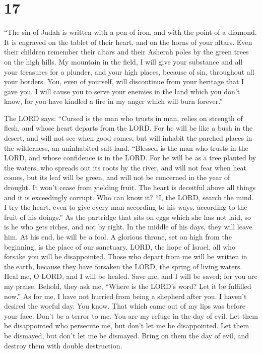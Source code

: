 \hypertarget{section-16}{%
\section{17}\label{section-16}}

 ``The sin of Judah is written with a pen of iron, and
with the point of a diamond. It is engraved on the tablet of their
heart, and on the horns of your altars.  Even their
children remember their altars and their Asherah poles by the green
trees on the high hills.  My mountain in the field, I will
give your substance and all your treasures for a plunder, and your high
places, because of sin, throughout all your borders.  You,
even of yourself, will discontinue from your heritage that I gave you. I
will cause you to serve your enemies in the land which you don't know,
for you have kindled a fire in my anger which will burn forever.''

 The LORD says: ``Cursed is the man who trusts in man,
relies on strength of flesh, and whose heart departs from the LORD.
 For he will be like a bush in the desert, and will not
see when good comes, but will inhabit the parched places in the
wilderness, an uninhabited salt land.  ``Blessed is the
man who trusts in the LORD, and whose confidence is in the LORD.
 For he will be as a tree planted by the waters, who
spreads out its roots by the river, and will not fear when heat comes,
but its leaf will be green, and will not be concerned in the year of
drought. It won't cease from yielding fruit.  The heart is
deceitful above all things and it is exceedingly corrupt. Who can know
it?  ``I, the LORD, search the mind. I try the heart,
even to give every man according to his ways, according to the fruit of
his doings.''  As the partridge that sits on eggs which
she has not laid, so is he who gets riches, and not by right. In the
middle of his days, they will leave him. At his end, he will be a fool.
 A glorious throne, set on high from the beginning, is
the place of our sanctuary.  LORD, the hope of Israel,
all who forsake you will be disappointed. Those who depart from me will
be written in the earth, because they have forsaken the LORD, the spring
of living waters.  Heal me, O LORD, and I will be healed.
Save me, and I will be saved; for you are my praise. 
Behold, they ask me, ``Where is the LORD's word? Let it be fulfilled
now.''  As for me, I have not hurried from being a
shepherd after you. I haven't desired the woeful day. You know. That
which came out of my lips was before your face.  Don't be
a terror to me. You are my refuge in the day of evil. 
Let them be disappointed who persecute me, but don't let me be
disappointed. Let them be dismayed, but don't let me be dismayed. Bring
on them the day of evil, and destroy them with double destruction.

